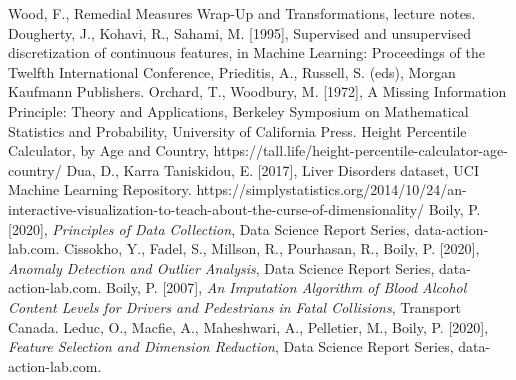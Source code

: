 \begin{thebibliography}{99}
Wood, F., Remedial Measures Wrap-Up and Transformations, lecture notes. 
Dougherty, J., Kohavi, R., Sahami, M. [1995], Supervised and unsupervised discretization of continuous features, in Machine Learning: Proceedings of the Twelfth International Conference, Prieditis, A., Russell, S. (eds), Morgan Kaufmann Publishers. 
Orchard, T., Woodbury, M. [1972], A Missing Information Principle: Theory and Applications, Berkeley Symposium on Mathematical Statistics and Probability, University of California Press.  
Height Percentile Calculator, by Age and Country, https://tall.life/height-percentile-calculator-age-country/ 
 Dua, D., Karra Taniskidou, E. [2017], Liver Disorders dataset, UCI Machine Learning Repository.
 {https://simplystatistics.org/2014/10/24/an-interactive-visualization-to-teach-about-the-curse-of-dimensionality/} 
 Boily, P. [2020], \textit{Principles of Data Collection}, Data Science Report Series, data-action-lab.com.
 Cissokho, Y., Fadel, S., Millson, R., Pourhasan, R., Boily, P. [2020], \textit{Anomaly Detection and Outlier Analysis}, Data Science Report Series, data-action-lab.com.
  Boily, P. [2007], \textit{An Imputation Algorithm of Blood Alcohol Content Levels for Drivers and Pedestrians in Fatal Collisions}, Transport Canada. 
 Leduc, O., Macfie, A., Maheshwari, A., Pelletier, M., Boily, P. [2020], \textit{Feature Selection and Dimension Reduction}, Data Science Report Series, data-action-lab.com.
\end{thebibliography}
%
